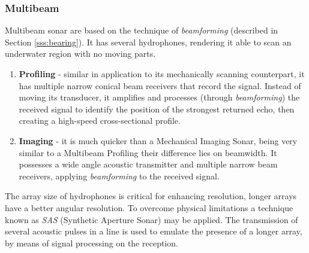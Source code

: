 
\subsubsection{Multibeam}

Multibeam sonar are based on the technique of \textit{beamforming} (described
in Section \ref{sss:bearing}). It has several hydrophones, rendering it able to
scan an underwater region with no moving parts.


\begin{enumerate}
  \item \textbf{Profiling} - similar in application to its mechanically scanning
  counterpart, it has multiple narrow conical beam receivers that record the
  signal. Instead of moving its transducer, it amplifies and processes (through
  \textit{beamforming}) the received signal to identify the position of the
  strongest returned echo, then creating a high-speed cross-sectional profile.
  \item \textbf{Imaging} - it is much quicker than a Mechanical Imaging
  Sonar, being very similar to a Multibeam Profiling their difference lies on
  beamwidth.   It possesses a wide angle acoustic transmitter and multiple
  narrow beam receivers, applying \textit{beamforming} to the received signal.
\end{enumerate}

The array size of hydrophones is critical for enhancing resolution, longer
arrays have a better angular resolution. To overcome physical limitations a
technique known as \textit{SAS} (Synthetic Aperture Sonar) may be applied. The
transmission of several acoustic pulses in a line is used to emulate the
presence of a longer array, by means of signal processing on the reception.
